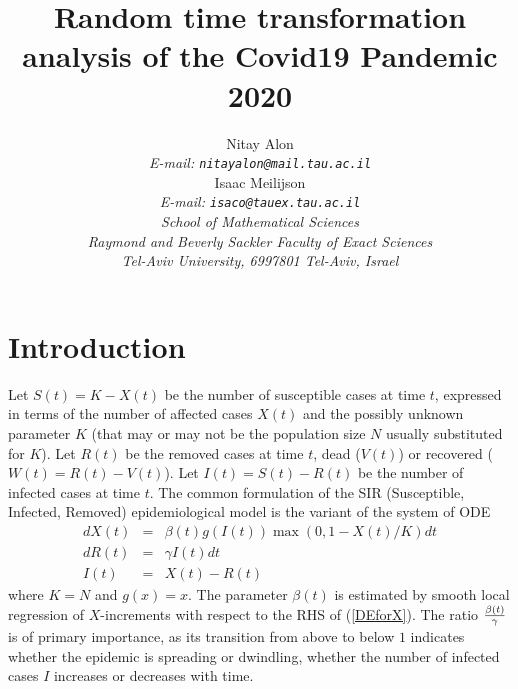 \documentclass{article}
\begin{document}
\title {Random time transformation analysis of the Covid19 Pandemic 2020}

\author {
Nitay Alon
\\
{\em E-mail: \tt{nitayalon@mail.tau.ac.il}} \\
Isaac Meilijson
\\
{\em E-mail: \tt{isaco@tauex.tau.ac.il}} \\
{\em School of Mathematical Sciences} \\
{\em Raymond and Beverly Sackler Faculty of Exact Sciences} \\
{\em Tel-Aviv University, 6997801 Tel-Aviv, Israel} \\
}


\maketitle


\begin{abstract}



%
\end{abstract}





\section{Introduction} \label{introduction}

Let $S(t) = K - X(t)$ be the number of susceptible cases at time $t$, expressed in terms of the number of affected cases $X(t)$ and the possibly unknown parameter $K$ (that may or may not be the population size $N$ usually substituted for $K$). Let $R(t)$ be the removed cases at time $t$, dead ($V(t)$) or recovered ($W(t)=R(t)-V(t)$). Let $I(t)=S(t)-R(t)$ be the number of infected cases at time $t$. The common formulation of the SIR (Susceptible, Infected, Removed) epidemiological model is the variant of the system of ODE
\begin{eqnarray}
dX(t) & = & \beta(t) g(I(t)) \max(0,1 - X(t)/K) dt \label{DEforX} \\
dR(t) & = & \gamma I(t) \label{DEforR} dt \\
I(t) & = & X(t)-R(t) \label{eqforI}
\end{eqnarray}
where $K=N$ and $g(x)=x$. The parameter $\beta(t)$ is estimated by smooth local regression of \linebreak $X$-increments with respect to the RHS of (\ref{DEforX}). The ratio ${{\beta(t)} \over \gamma}$ is of primary importance, as its transition from above to below $1$ indicates whether the epidemic is spreading or dwindling, whether the number of infected cases $I$ increases or decreases with time.
\end{document}
